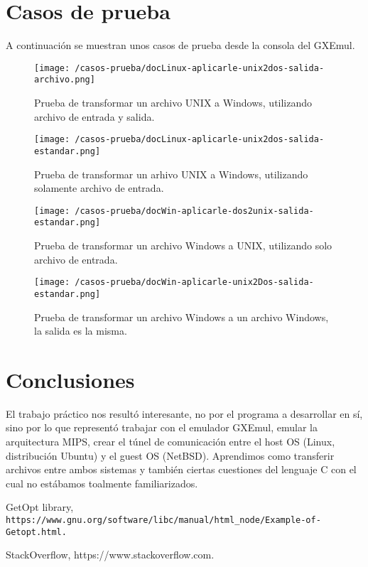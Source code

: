 \documentclass[a4paper]{article}
\begin{document}
\section{Casos de prueba}

A continuación se muestran unos casos de prueba desde la consola del GXEmul.


\begin{figure}[!htp]
\begin{center}
\texttt{[image: /casos-prueba/docLinux-aplicarle-unix2dos-salida-archivo.png]}
\caption{Prueba de transformar un archivo UNIX a Windows, utilizando archivo de entrada y salida.} \label{fig001}
\end{center}
\end{figure}

\begin{figure}[!htp]
\begin{center}
\texttt{[image: /casos-prueba/docLinux-aplicarle-unix2dos-salida-estandar.png]}
\caption{Prueba de transformar un arhivo UNIX a Windows, utilizando solamente archivo de entrada.} \label{fig001}
\end{center}
\end{figure}

\begin{figure}[!htp]
\begin{center}
\texttt{[image: /casos-prueba/docWin-aplicarle-dos2unix-salida-estandar.png]}
\caption{Prueba de transformar un archivo Windows a UNIX, utilizando solo archivo de entrada.} \label{fig001}
\end{center}
\end{figure}

\begin{figure}[!htp]
\begin{center}
\texttt{[image: /casos-prueba/docWin-aplicarle-unix2Dos-salida-estandar.png]}
\caption{Prueba de transformar un archivo Windows a un archivo Windows, la salida es la misma.} \label{fig001}
\end{center}
\end{figure}

\pagebreak


\section{Conclusiones}

El trabajo práctico nos resultó interesante, no por el programa a desarrollar en sí, sino por lo que representó trabajar con el emulador GXEmul, emular la arquitectura MIPS, crear el túnel de comunicación entre el host OS (Linux, distribución Ubuntu) y el guest OS (NetBSD). Aprendimos como transferir archivos entre ambos sistemas y también ciertas cuestiones del lenguaje C con el cual no estábamos toalmente familiarizados.

\begin{thebibliography}{2}

 GetOpt library, 
\texttt{https://www.gnu.org/software/libc/manual/html_node/Example-of-Getopt.html.}

 StackOverflow, https://www.stackoverflow.com.

\end{thebibliography}
\end{document}
